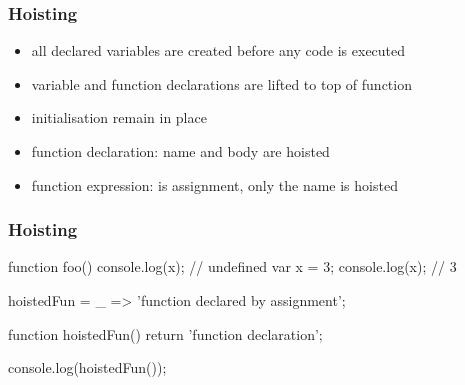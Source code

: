 \begin{frame}[fragile] \frametitle{Hoisting}
\begin{itemize}
  \item all declared variables are created before any code is executed
  \item variable and function declarations are lifted to top of function
  \item initialisation remain in place
  \item function declaration: name and body are hoisted
  \item function expression: is assignment, only the name is hoisted
\end{itemize}
\end{frame}

\begin{frame}[fragile] \frametitle{Hoisting}
\begin{CodeBox}{}
function foo() {
  console.log(x);  // undefined
  var x = 3;
  console.log(x);  // 3
}
\end{CodeBox}

\begin{CodeBox}{}
hoistedFun = _ => 'function declared by assignment';

function hoistedFun() {
  return 'function declaration';
}

console.log(hoistedFun());
\end{CodeBox}

\end{frame}

